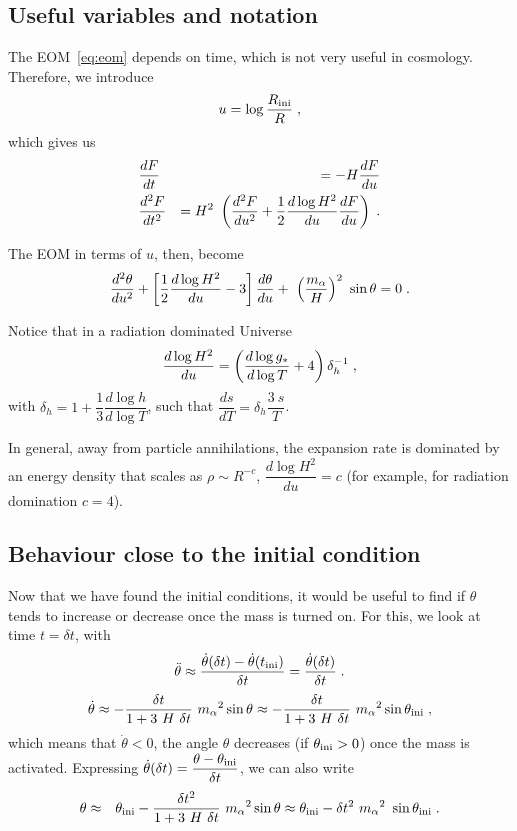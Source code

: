 \documentclass[11pt,a4paper]{article}
\begin{document}
\subsection{Useful variables and notation}
%
The EOM~\ref{eq:eom} depends on time, which is not very useful in cosmology. Therefore, we introduce 
%
\begin{eqnarray}
	u = \log \dfrac{R_{\rm ini}{}}{R} \;,
	\label{eq:natation}
\end{eqnarray}
%
which gives us 
%
\begin{eqnarray}
	&\dfrac{d F}{dt} &= - H  \dfrac{d F}{du} 
	\nonumber \\
	&\dfrac{d^2 F}{dt^2} &= H^2 \ \left(  \dfrac{d^2 F}{du^2} + \dfrac{1}{2} \dfrac{d \log H^2}{du}  \dfrac{d F}{du}  \right)\;.
	\label{eq:deriv_u}
\end{eqnarray}

The EOM in terms of $u$, then, become
%
\begin{equation}
	\dfrac{d^2  \theta}{du^2} + \left[ \dfrac{1}{2} \dfrac{d \log H^2}{du} - 3  \right] \dfrac{d  \theta}{d u} + \ \left( \dfrac{m_\alpha{}}{H} \right)^2 \ \sin \theta
	=0 \;.
	\label{eq:eom_u}
\end{equation}

Notice that in a radiation dominated Universe
%
$$
\dfrac{d \log H^2}{du} = \left(  \dfrac{d \log g_*}{d \log T} +4  \right) \delta_h^{-1}\;,
$$
with  $ \delta_h = 1+ \dfrac{1}{3} \dfrac{d \log h}{d \log T} $, such that 
$\dfrac{d s}{d T} = \delta_h \dfrac{3 \ s}{T}$. 

In general, away from particle annihilations, the expansion rate is dominated by an energy density that scales as $\rho \sim R^{-c}$, \ie $\dfrac{d \log H^2}{du}  = c$ (for example, for radiation domination $c=4$). 


\subsection{Behaviour close to the initial condition}
%
Now that we have found the initial conditions, it would be useful to find if $\theta$ tends to increase or decrease once the mass is turned on. For this, we look at time $t = \delta t$, with 
%
\begin{equation*}
	\ddot{\theta} \approx \dfrac{\dot \theta (\delta t)  - \dot \theta (t_{\rm ini}{})}{ \delta  t } =  \dfrac{\dot \theta (\delta t)  }{\delta  t } \;.
\end{equation*} 
%
\begin{equation*}
	\dot{\theta} \approx  - \dfrac{\delta t}{1+3 \ H \ \delta t} \  \ma^2  \sin \theta  \approx  - \dfrac{\delta t}{1+3 \ H \ \delta t} \  \ma^2  \sin \thetai\;,
\end{equation*} 
%
which means that $\dot\theta<0$, \ie the angle $\theta$ decreases (if $\theta_{\rm ini}{}>0$) once the mass is activated. Expressing $\dot \theta(\delta t) = \dfrac{\theta - \theta_{\rm ini}{}}{\delta t}$, we can also write
%
\begin{eqnarray}
		\theta & \approx & \thetai -\dfrac{\delta t^2}{1+3 \ H \ \delta t} \  \ma^2  \sin \theta  
	 \approx   \thetai - \delta t^2 \ \ma^2 \ \sin \thetai \;. 
	 \label{eq:theta_dt}
\end{eqnarray}
\end{document}
